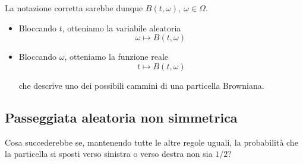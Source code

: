 \documentclass[10pt,a4paper,twoside,openright]{book}
\begin{document}
La notazione corretta sarebbe dunque $\displaystyle B(t,\omega),\ \omega \in \Omega $. 
\begin{itemize}
\item Bloccando $\displaystyle t$, otteniamo la variabile aleatoria\begin{equation*}
\omega \longmapsto B(t,\omega) \ 
\end{equation*}
\item Bloccando $\displaystyle \omega $, otteniamo la funzione reale\begin{equation*}
t\longmapsto B(t,\omega)
\end{equation*}

che descrive uno dei possibili cammini di una particella Browniana.
\end{itemize}
\subsection{Passeggiata aleatoria non simmetrica}

Cosa succederebbe se, mantenendo tutte le altre regole uguali, la probabilità che la particella si sposti verso sinistra o verso destra non sia $\displaystyle 1/2$?
\end{document}
